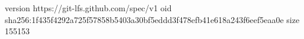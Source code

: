 version https://git-lfs.github.com/spec/v1
oid sha256:1f435f4292a725f57858b5403a30bf5eddd3f478efb41e618a243f6eef5eaa0e
size 155153
